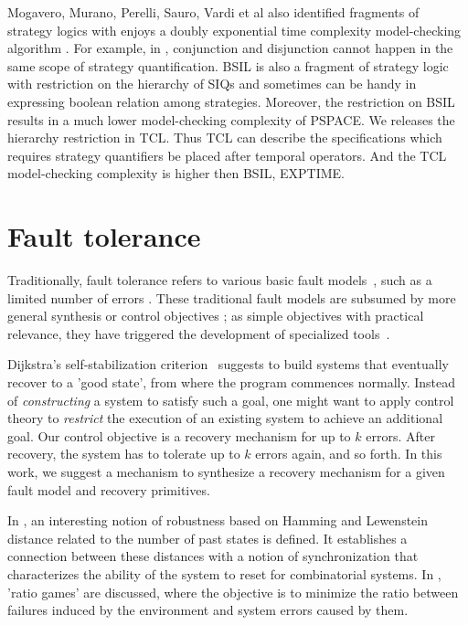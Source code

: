 Mogavero, Murano, Perelli, Sauro, Vardi et al also identified fragments of strategy logics with enjoys a doubly exponential time complexity model-checking algorithm \cite{MMV10,MMPV12,MMS13}. 
For example, in \cite{MMS13}, conjunction and disjunction cannot happen in the same scope of 
strategy quantification.
BSIL is also a fragment of strategy logic with restriction on the hierarchy of SIQs and sometimes can be handy in expressing boolean relation among strategies. 
Moreover, the restriction on BSIL results in a much lower model-checking complexity of PSPACE.
We releases the hierarchy restriction in TCL.
Thus TCL can describe the specifications which requires strategy quantifiers be placed after temporal operators.
And the TCL model-checking complexity is higher then BSIL, EXPTIME.

\section{Fault tolerance}
Traditionally, fault tolerance refers to various basic fault models~\cite{AAE04}, such as a limited number of errors \cite{JRT04}.
These traditional fault models are subsumed by more general synthesis or control objectives 
\cite{AMP95,AAE04,Thomas94}; 
as simple objectives with practical relevance, they have triggered the development of specialized tools~\cite{EKA08,GR09}.

Dijkstra's self-stabilization criterion~\cite{AG93,Dijkstra86} suggests to build systems that eventually recover to a 'good state', from where the program commences normally.
Instead of {\em constructing} a system to satisfy such a goal, one might want to apply control theory to {\em restrict} the execution of an existing system to achieve an additional goal.
Our control objective is a recovery mechanism for up to $k$ errors.
After recovery, the system has to tolerate up to $k$ errors again, and so forth.
In this work, we suggest a mechanism to synthesize a recovery mechanism for a given fault model and recovery primitives.

In \cite{DHLN10}, an interesting notion of robustness based on Hamming and Lewenstein distance related to the number of past states is defined.
It establishes a connection between these distances with a notion of synchronization that characterizes the ability of the system to reset for combinatorial systems.
In \cite{BGHJ09}, 'ratio games' are discussed, where the objective is to minimize the ratio between failures induced by the environment and system errors caused by them.

